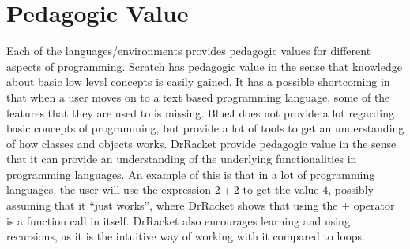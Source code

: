 \section{Pedagogic Value}
\label{sec:pedagogic_value}
Each of the languages/environments provides pedagogic values for different aspects of programming. Scratch has pedagogic value in the sense that knowledge about basic low level concepts is easily gained. It has a possible shortcoming in that when a user moves on to a text based programming language, some of the features that they are used to is missing. BlueJ does not provide a lot regarding basic concepts of programming, but provide a lot of tools to get an understanding of how classes and objects works. DrRacket provide pedagogic value in the sense that it can provide an understanding of the underlying functionalities in programming languages. An example of this is that in a lot of programming languages, the user will use the expression $2+2$ to get the value $4$, possibly assuming that it ``just works'', where DrRacket shows that using the $+$ operator is a function call in itself. DrRacket also encourages learning and using recursions, as it is the intuitive way of working with it compared to loops. 